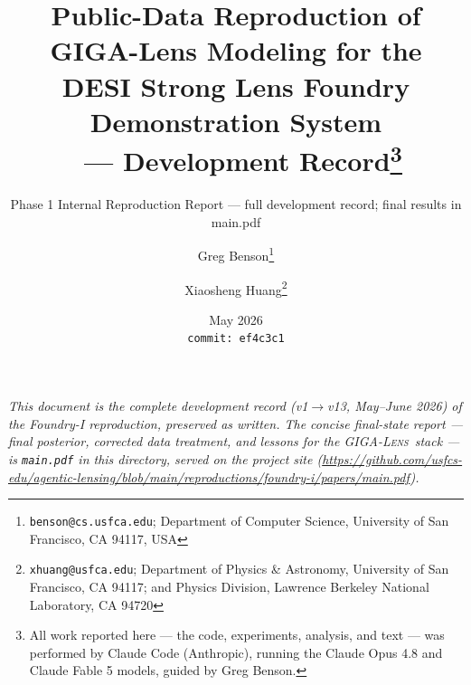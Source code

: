 \documentclass[11pt,letterpaper]{article}
\title{Public-Data Reproduction of GIGA-Lens Modeling for the\\
       DESI Strong Lens Foundry Demonstration System\\
       \foundry\ --- Development Record\thanks{All work reported here
       --- the code, experiments, analysis, and text --- was performed
       by Claude Code (Anthropic), running the Claude Opus 4.8 and
       Claude Fable 5 models, guided by Greg Benson.}}
\author{Greg Benson\thanks{\texttt{benson@cs.usfca.edu};
        Department of Computer Science, University of San Francisco,
        CA 94117, USA} \and
        Xiaosheng Huang\thanks{\texttt{xhuang@usfca.edu};
        Department of Physics \& Astronomy, University of San Francisco,
        CA 94117; and Physics Division, Lawrence Berkeley National
        Laboratory, CA 94720}}
\date{May 2026 \\ \texttt{commit:~ef4c3c1}}
\newcommand{\gigalens}{\textsc{GIGA-Lens}}
\begin{document}
\maketitle
\subtitle{Phase 1 Internal Reproduction Report --- full development record; final results in main.pdf}

\begin{center}\itshape
This document is the complete development record (v1$\to$v13, May--June
2026) of the Foundry-I reproduction, preserved as written. The concise
final-state report --- final posterior, corrected data treatment, and
lessons for the \gigalens\ stack --- is \texttt{main.pdf} in this
directory, served on the project site
(\url{https://github.com/usfcs-edu/agentic-lensing/blob/main/reproductions/foundry-i/papers/main.pdf}).
\end{center}
\end{document}
